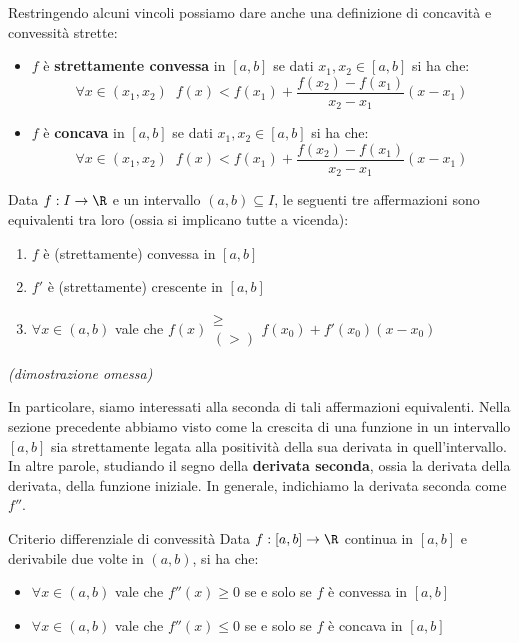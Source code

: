 \documentclass[a4paper, 12pt]{report}
\begin{document}
    Restringendo alcuni vincoli possiamo dare anche una definizione di concavità e convessità strette:
    \begin{itemize}
        \item $f$ è \textbf{strettamente convessa} in $[a,b]$ se dati $x_1,x_2 \in [a,b]$ si ha che:
        \[\forall x \in (x_1,x_2) \;\; f(x) < f(x_1) + \dfrac{f(x_2)-f(x_1)}{x_2-x_1}(x-x_1)\]
        \item $f$ è \textbf{concava} in $[a,b]$ se dati $x_1,x_2 \in [a,b]$ si ha che:
        \[\forall x \in (x_1,x_2) \;\; f(x) < f(x_1) + \dfrac{f(x_2)-f(x_1)}{x_2-x_1}(x-x_1)\]
    \end{itemize}

    \begin{framedthm}{}
        Data $f:I \to \R$ e un intervallo $(a,b) \subseteq I$, le seguenti tre affermazioni sono equivalenti tra loro (ossia si implicano tutte a vicenda):
        \begin{enumerate}
            \item $f$ è (strettamente) convessa in $[a,b]$
            \item $f'$ è (strettamente) crescente in $[a,b]$
            \item $\forall x \in (a,b)$ vale che $f(x) \substack{\geq \\ (>)} f(x_0) + f'(x_0)(x-x_0)$
        \end{enumerate}

        \textit{(dimostrazione omessa)}
    \end{framedthm}

    In particolare, siamo interessati alla seconda di tali affermazioni equivalenti. Nella sezione precedente abbiamo visto come la crescita di una funzione in un intervallo $[a,b]$ sia strettamente legata alla positività della sua derivata in quell'intervallo. In altre parole, studiando il segno della \textbf{derivata seconda}, ossia la derivata della derivata, della funzione iniziale. In generale, indichiamo la derivata seconda come $f''$.

    \begin{framedcor}{Criterio differenziale di convessità}
        Data $f : [a,b] \to \R$ continua in $[a,b]$ e derivabile due volte in $(a,b)$, si ha che:
        \begin{itemize}
            \item $\forall x \in (a,b)$ vale che $f''(x) \geq 0$ se e solo se $f$ è convessa in $[a,b]$
            \item $\forall x \in (a,b)$ vale che $f''(x) \leq 0$ se e solo se $f$ è concava  in $[a,b]$
        \end{itemize}
    \end{framedcor}
\end{document}
